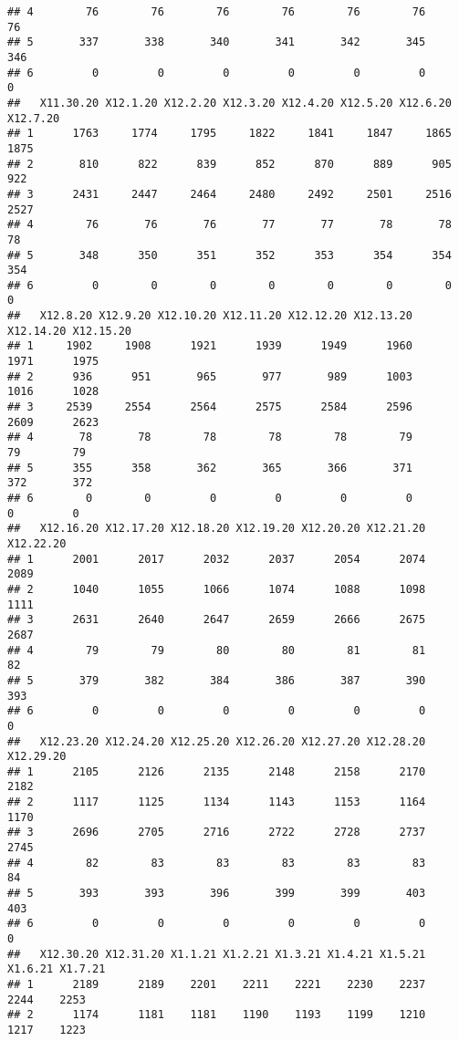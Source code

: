 \documentclass[
]{article}
\begin{document}
\begin{verbatim}
## 4        76        76        76        76        76        76        76
## 5       337       338       340       341       342       345       346
## 6         0         0         0         0         0         0         0
##   X11.30.20 X12.1.20 X12.2.20 X12.3.20 X12.4.20 X12.5.20 X12.6.20 X12.7.20
## 1      1763     1774     1795     1822     1841     1847     1865     1875
## 2       810      822      839      852      870      889      905      922
## 3      2431     2447     2464     2480     2492     2501     2516     2527
## 4        76       76       76       77       77       78       78       78
## 5       348      350      351      352      353      354      354      354
## 6         0        0        0        0        0        0        0        0
##   X12.8.20 X12.9.20 X12.10.20 X12.11.20 X12.12.20 X12.13.20 X12.14.20 X12.15.20
## 1     1902     1908      1921      1939      1949      1960      1971      1975
## 2      936      951       965       977       989      1003      1016      1028
## 3     2539     2554      2564      2575      2584      2596      2609      2623
## 4       78       78        78        78        78        79        79        79
## 5      355      358       362       365       366       371       372       372
## 6        0        0         0         0         0         0         0         0
##   X12.16.20 X12.17.20 X12.18.20 X12.19.20 X12.20.20 X12.21.20 X12.22.20
## 1      2001      2017      2032      2037      2054      2074      2089
## 2      1040      1055      1066      1074      1088      1098      1111
## 3      2631      2640      2647      2659      2666      2675      2687
## 4        79        79        80        80        81        81        82
## 5       379       382       384       386       387       390       393
## 6         0         0         0         0         0         0         0
##   X12.23.20 X12.24.20 X12.25.20 X12.26.20 X12.27.20 X12.28.20 X12.29.20
## 1      2105      2126      2135      2148      2158      2170      2182
## 2      1117      1125      1134      1143      1153      1164      1170
## 3      2696      2705      2716      2722      2728      2737      2745
## 4        82        83        83        83        83        83        84
## 5       393       393       396       399       399       403       403
## 6         0         0         0         0         0         0         0
##   X12.30.20 X12.31.20 X1.1.21 X1.2.21 X1.3.21 X1.4.21 X1.5.21 X1.6.21 X1.7.21
## 1      2189      2189    2201    2211    2221    2230    2237    2244    2253
## 2      1174      1181    1181    1190    1193    1199    1210    1217    1223

\end{verbatim}
\end{document}
